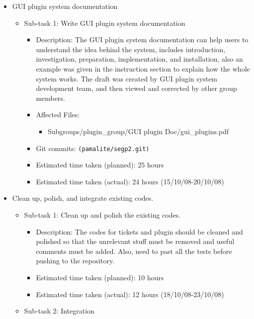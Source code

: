 \documentclass{article}
\begin{document}
\begin{itemize}
    \item GUI plugin system documentation
        \begin{itemize}
            \item Sub-task 1: Write GUI plugin system documentation
                \begin{itemize}
                    \item Description: The GUI plugin system documentation can help users to understand the idea behind the system, includes introduction, investigation, preparation, implementation, and installation, also an example was given in the instruction section to explain how the whole system works. The draft was created by GUI plugin system development team, and then viewed and corrected by other group members.
		     \item Affected Files:
                	\begin{itemize}
                    		\item Subgroups/plugin\_group/GUI plugin Doc/gui\_plugins.pdf
                	\end{itemize}
		    \item Git commits: \texttt{(pamalite/segp2.git)}
                    \item Estimated time taken (planned): 25 hours
                    \item Estimated time taken (actual):  24 hours (15/10/08-20/10/08)
                \end{itemize}
        \end{itemize}
    \item Clean up, polish, and integrate existing codes.
        \begin{itemize}
            \item Sub-task 1: Clean up and polish the existing codes.
                \begin{itemize}
                    \item Description: The codes for tickets and plugin should be cleaned and polished so that the unrelevant stuff must be removed and useful comments must be added. Also, need to past all the tests before pushing to the repository. 
                    \item Estimated time taken (planned): 10 hours
                    \item Estimated time taken (actual): 12 hours (18/10/08-23/10/08)
                \end{itemize}
            \item Sub-task 2: Integration

\end{itemize}
\end{itemize}
\end{document}
